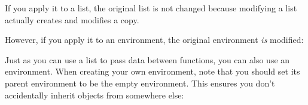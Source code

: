 \begin{Shaded}
\begin{Highlighting}[]
\StringTok{ }
  \StringTok{ }
  \NormalTok{()}
\NormalTok{\}}
\end{Highlighting}
\end{Shaded}

If you apply it to a list, the original list is not changed because
modifying a list actually creates and modifies a copy.

\begin{Shaded}
\begin{Highlighting}[]
\StringTok{ }\NormalTok{()}
\StringTok{ }
\end{Highlighting}
\end{Shaded}

However, if you apply it to an environment, the original environment
\emph{is} modified:

\begin{Shaded}
\begin{Highlighting}[]
\StringTok{ }\NormalTok{()}
\StringTok{ }
\end{Highlighting}
\end{Shaded}

Just as you can use a list to pass data between functions, you can also
use an environment. When creating your own environment, note that you
should set its parent environment to be the empty environment. This
ensures you don't accidentally inherit objects from somewhere else:

\begin{Shaded}
\begin{Highlighting}[]
\StringTok{ }
\StringTok{ }\NormalTok{()}
\NormalTok{(}\NormalTok{, } 

\StringTok{ }\NormalTok{(} \NormalTok{())}
\NormalTok{(}\NormalTok{, } 
\end{Highlighting}
\end{Shaded}

